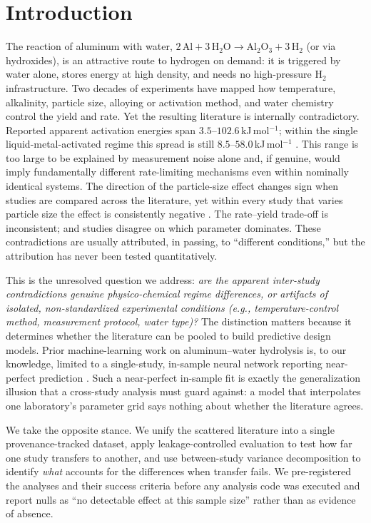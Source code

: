 \section{Introduction}

The reaction of aluminum with water,
$2\,\mathrm{Al}+3\,\mathrm{H_2O}\rightarrow\mathrm{Al_2O_3}+3\,\mathrm{H_2}$
(or via hydroxides), is an attractive route to hydrogen on demand: it is triggered by
water alone, stores energy at high density, and needs no high-pressure H$_2$
infrastructure. Two decades of experiments have mapped how temperature, alkalinity,
particle size, alloying or activation method, and water chemistry control the yield and
rate. Yet the resulting literature is internally contradictory. Reported apparent
activation energies span $3.5$--$102.6$\,kJ\,mol$^{-1}$; within the single
liquid-metal-activated regime this spread is still $8.5$--$58.0$\,kJ\,mol$^{-1}$
\citep{ilyukhina2012,dudoladov2016}. This range is too large to be explained by
measurement noise alone and, if genuine, would imply fundamentally different rate-limiting
mechanisms even within nominally identical systems. The direction of the particle-size effect changes
sign when studies are compared across the literature, yet within every study that varies
particle size the effect is consistently negative
\citep{zhang2024,prabu2021,wen2018,porciuncula2012}. The rate--yield trade-off
is inconsistent; and studies disagree on which parameter dominates. These contradictions
are usually attributed, in passing, to ``different conditions,'' but the attribution has
never been tested quantitatively.

This is the unresolved question we address: \emph{are the apparent inter-study
contradictions genuine physico-chemical regime differences, or artifacts of isolated,
non-standardized experimental conditions (e.g., temperature-control method, measurement
protocol, water type)?} The distinction matters because it determines
whether the literature can be pooled to build predictive design models. Prior
machine-learning work on aluminum--water hydrolysis is, to our knowledge, limited to a
single-study, in-sample neural network reporting near-perfect prediction
\citep{das2023fuel}. Such a near-perfect in-sample fit is exactly the generalization
illusion that a cross-study analysis must guard against: a model that interpolates one
laboratory's parameter grid says nothing about whether the literature agrees.

We take the opposite stance. We unify the scattered literature into a single
provenance-tracked dataset, apply leakage-controlled evaluation to test how far one study
transfers to another, and use between-study variance decomposition to identify
\emph{what} accounts for the differences when transfer fails. We pre-registered the
analyses and their success criteria before any analysis code was executed and report nulls as ``no
detectable effect at this sample size'' rather than as evidence of absence.

